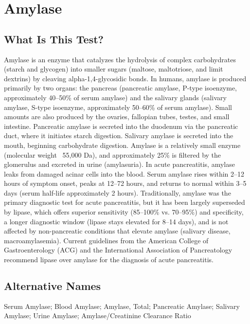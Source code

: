 \chapter{Amylase}

\section*{What Is This Test?}
Amylase is an enzyme that catalyzes the hydrolysis of complex carbohydrates (starch and glycogen) into smaller sugars (maltose, maltotriose, and limit dextrins) by cleaving alpha-1,4-glycosidic bonds. In humans, amylase is produced primarily by two organs: the pancreas (pancreatic amylase, P-type isoenzyme, approximately 40--50\% of serum amylase) and the salivary glands (salivary amylase, S-type isoenzyme, approximately 50--60\% of serum amylase). Small amounts are also produced by the ovaries, fallopian tubes, testes, and small intestine. Pancreatic amylase is secreted into the duodenum via the pancreatic duct, where it initiates starch digestion. Salivary amylase is secreted into the mouth, beginning carbohydrate digestion. Amylase is a relatively small enzyme (molecular weight ~55,000 Da), and approximately 25\% is filtered by the glomerulus and excreted in urine (amylasuria). In acute pancreatitis, amylase leaks from damaged acinar cells into the blood. Serum amylase rises within 2--12 hours of symptom onset, peaks at 12--72 hours, and returns to normal within 3--5 days (serum half-life approximately 2 hours). Traditionally, amylase was the primary diagnostic test for acute pancreatitis, but it has been largely superseded by lipase, which offers superior sensitivity (85--100\% vs. 70--95\%) and specificity, a longer diagnostic window (lipase stays elevated for 8--14 days), and is not affected by non-pancreatic conditions that elevate amylase (salivary disease, macroamylasemia). Current guidelines from the American College of Gastroenterology (ACG) and the International Association of Pancreatology recommend lipase over amylase for the diagnosis of acute pancreatitis.

\section*{Alternative Names}
Serum Amylase; Blood Amylase; Amylase, Total; Pancreatic Amylase; Salivary Amylase; Urine Amylase; Amylase/Creatinine Clearance Ratio


